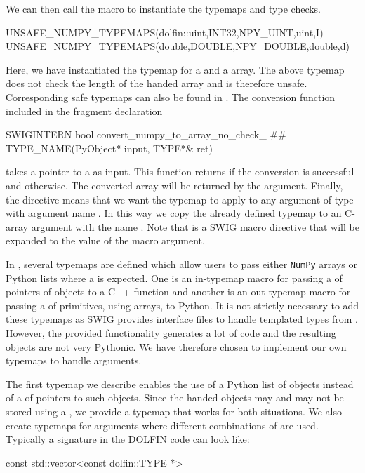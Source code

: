 \pagebreak

\noindent We can then call the macro to instantiate the typemaps and type checks.
\begin{swigcode}
UNSAFE_NUMPY_TYPEMAPS(dolfin::uint,INT32,NPY_UINT,uint,I)
UNSAFE_NUMPY_TYPEMAPS(double,DOUBLE,NPY_DOUBLE,double,d)
\end{swigcode}
Here, we have instantiated the typemap for a  and a
 array. The above typemap does not check the length of the
handed \numpy array and is therefore unsafe. Corresponding safe
typemaps can also be found in . The conversion
function included in the fragment declaration
\begin{swigcode}
SWIGINTERN bool convert_numpy_to_array_no_check_ ## TYPE_NAME(PyObject* input, TYPE*& ret)
\end{swigcode}
takes a pointer to a  as input. This function returns
 if the conversion is successful and 
otherwise. The converted array will be returned by the  argument.  Finally, the 
directive means that we want the typemap to apply to any argument of
type  with argument name . In this way we copy
the already defined typemap to an C-array argument with the name
.  Note that  is a SWIG macro
directive that will be expanded to the value of the 
macro argument.

In , several typemaps are defined which
allow users to pass either \texttt{NumPy} arrays or Python lists where
a  is expected. One is an in-typemap macro for
passing a  of pointers of \dolfin objects to a C++
function and another is an out-typemap macro for passing a
 of primitives, using \numpy arrays, to Python. It is
not strictly necessary to add these typemaps as SWIG provides
interface files to handle templated types from
. However, the provided 
functionality generates a lot of code and the resulting objects are
not very Pythonic. We have therefore chosen to implement our own
typemaps to handle  arguments.

The first typemap we describe enables the use of a Python list of
\dolfin objects instead of a  of pointers to such
objects. Since the handed \dolfin objects may and may not be stored
using a , we provide a typemap that works for both
situations. We also create typemaps for arguments where different
combinations of  are used. Typically a signature in the
DOLFIN code can look like:
\begin{swigcode}
{const} std::vector<{const} dolfin::TYPE *>
\end{swigcode}

